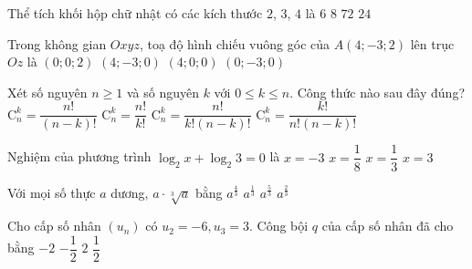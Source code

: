 \begin{ex}%
	Thể tích khối hộp chữ nhật có các kích thước $2$, $3$, $4$ là
	\choice
	{$6$}
	{$8$}
	{$72$}
	{\True $24$}
\end{ex}
\begin{ex}%
	Trong không gian $O x y z$, toạ độ hình chiếu vuông góc của $A(4 ;-3 ; 2)$ lên trục $O z$ là
	\choice
	{ \True $(0 ; 0 ; 2)$}
	{ $(4 ;-3 ; 0)$}
	{ $(4 ; 0 ; 0)$}
	{ $(0 ;-3 ; 0)$}
\end{ex}
\begin{ex}%
	Xét số nguyên $n \geq 1$ và số nguyên $k$ với $0 \leq k \leq n$. Công thức nào sau đây đúng?
	\choice
	{ $\mathrm{C}_{n}^{k}=\dfrac{n !}{(n-k) !}$}
	{ $\mathrm{C}_{n}^{k}=\dfrac{n !}{k !}$}
	{\True $\mathrm{C}_{n}^{k}=\dfrac{n !}{k !(n-k) !}$}
	{ $\mathrm{C}_{n}^{k}=\dfrac{k !}{n !(n-k) !}$}
\end{ex}
\begin{ex}%
	Nghiệm của phương trình $\log _{2} x+\log _{2} 3=0$ là
	\choice
	{ $x=-3$}
	{ $x=\dfrac{1}{8}$}
	{\True $x=\dfrac{1}{3}$}
	{ $x=3$}
\end{ex}
\begin{ex}%
	Với mọi số thực $a$ dương, $a\cdot \sqrt[3]{a}$ bằng
	\choice
	{\True $a^{\tfrac{4}{3}}$}
	{ $a^{\tfrac{1}{3}}$}
	{ $a^{\tfrac{5}{3}}$}
	{ $a^{\tfrac{2}{3}}$}
\end{ex}
\begin{ex}%
	Cho cấp số nhân $\left(u_{n}\right)$ có $u_{2}=-6, u_{3}=3$. Công bội $q$ của cấp số nhân đã cho bằng
	\choice
	{ $-2$}
	{\True $-\dfrac{1}{2}$}
	{ $2 $}
	{ $\dfrac{1}{2}$}
\end{ex}
